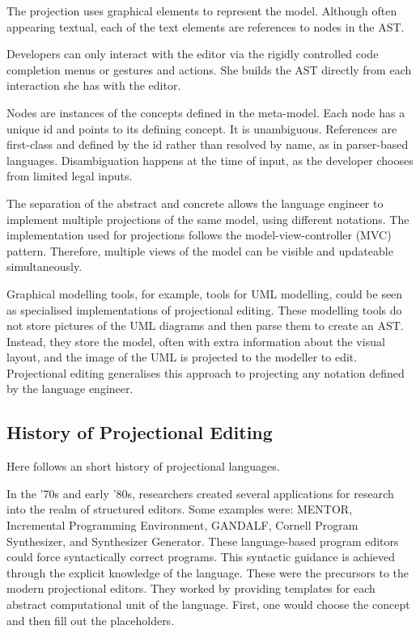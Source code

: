 The projection uses graphical elements to represent the model.
Although often appearing textual, each of the text elements are references to nodes in the AST.

Developers can only interact with the editor via the rigidly controlled code completion menus or gestures and actions.
She builds the AST directly from each interaction she has with the editor.

Nodes are instances of the concepts defined in the meta-model.
Each node has a unique id and points to its defining concept.
It is unambiguous.
References are first-class and defined by the id rather than resolved by name, as in parser-based languages.
Disambiguation happens at the time of input, as the developer chooses from limited legal inputs.

The separation of the abstract and concrete allows the language engineer to implement multiple projections of the same model, using different notations.
The implementation used for projections follows the model-view-controller (MVC) pattern.
Therefore, multiple views of the model can be visible and updateable simultaneously.

Graphical modelling tools, for example, tools for UML modelling, could be seen as specialised implementations of projectional editing.
These modelling tools do not store pictures of the UML diagrams and then parse them to create an AST.
Instead, they store the model, often with extra information about the visual layout, and the image of the UML is projected to the modeller to edit.
Projectional editing generalises this approach to projecting any notation defined by the language engineer.

\subsection{History of Projectional Editing}

Here follows an short history of projectional languages.

In the '70s and early '80s, researchers created several applications for research into the realm of structured editors.
Some examples were: MENTOR\cite{donzeau1980programming}, Incremental Programming Environment\cite{medina1981incremental}, GANDALF\cite{NotkinDavid1985TGp}, Cornell Program Synthesizer\cite{teitelbaum1981cornell}, and Synthesizer Generator\cite{reps2012synthesizer}.
These language-based program editors could force syntactically correct programs. 
This syntactic guidance is achieved through the explicit knowledge of the language. 
These were the precursors to the modern projectional editors. 
They worked by providing templates for each abstract computational unit of the language.
First, one would choose the concept and then fill out the placeholders.

